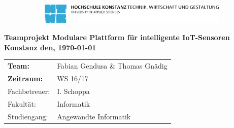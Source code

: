 
\begin{titlepage}

\vspace*{-3.5cm}

\begin{flushleft}
\hspace*{-1cm} 

\begin{figure}
\begin{subfigure}[c]{0.7\textwidth}
\includegraphics[width=\textwidth]{preface/htwg-logo}
\end{subfigure}

\end{figure}
\end{flushleft}

\vspace{5cm}

\begin{center}
	\large{
		\textbf{Teamprojekt Modulare Plattform für intelligente IoT-Sensoren} \\[.2cm]
	}
	\small{
		\textbf{Konstanz den, \today}	}\\[1cm]
		
	
\vspace{6cm}
	
	
	\large{
		\begin{flushleft}
			\begin{tabular}{ll}
				\textbf{Team:} & Fabian Gendusa \& Thomas Gnädig \\
				\textbf{Zeitraum:} & WS 16/17 \\
				Fachbetreuer: & I. Schoppa \\
				Fakultät: & Informatik \\
				Studiengang: & Angewandte Informatik \\
			\end{tabular}
		\end{flushleft}
	}
	

\end{center}

\end{titlepage}
\thispagestyle{empty}


